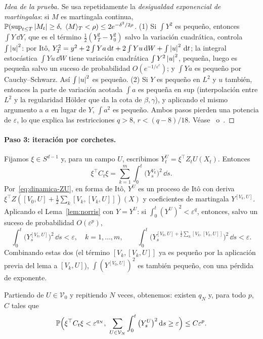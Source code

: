 \begin{proof}[Idea de la prueba]
Se usa repetidamente la \emph{desigualdad exponencial de martingalas}: si $M$ es
martingala continua, $\mathbb{P}(\sup_{t\le T}\left\lvert M_t\right\rvert\ge\delta,\ \langle M\rangle_T<\rho)\le2e^{-\delta^2/2\rho}$. (1) Si $\int Y^2$ es pequeño,
entonces $\int Y\,\dd Y$, que es el término $\frac12(Y_T^2-Y_0^2)$ salvo la variación cuadrática, controla $\int\left\lvert u\right\rvert^2$: por
Itô, $Y_T^2=y^2+2\int Ya\,\mathrm{d} t+2\int Yu\,\mathrm{d} W+\int\left\lvert u\right\rvert^2\,\mathrm{d} t$; la integral estocástica $\int Yu\,\dd W$ tiene variación
cuadrática $\int Y^2\left\lvert u\right\rvert^2$, pequeña, luego es pequeña salvo un suceso de probabilidad $O(e^{-1/\varepsilon^c})$; y
$\int Ya$ es pequeño por Cauchy--Schwarz. Así $\int\left\lvert u\right\rvert^2$ es pequeño. (2) Si $Y$ es pequeño en $L^2$ y $u$
también, entonces la parte de variación acotada $\int a$ es pequeña en sup (interpolación entre $L^2$ y
la regularidad Hölder que da la cota de $\beta,\gamma$), y aplicando el mismo argumento a $a$ en lugar de
$Y$, $\int a^2$ es pequeño. Ambos pasos pierden una potencia de $\varepsilon$, lo que explica las restricciones
$q>8$, $r<(q-8)/18$. Véase~\cite{Norris86} o~\cite[Lemma~2.3.2]{Nualart06}.
\end{proof}

\paragraph{Paso 3: iteración por corchetes.} Fijamos $\xi\in S^{d-1}$ y, para un campo $U$, escribimos
$Y^U_t=\xi^\top Z_tU(X_t)$. Entonces
\[
  \xi^\top C_t\xi=\sum_{k=1}^m\int_0^t\big(Y^{V_k}_s\big)^2\,\dd s.
\]
Por~\eqref{eq:dinamica-ZU}, en forma de Itô, $Y^U$ es un proceso de Itô con deriva $\xi^\top Z([V_0,U]+
\frac12\sum_k[V_k,[V_k,U]])(X)$ y coeficientes de martingala $Y^{[V_k,U]}$. Aplicando el Lema~\ref{lem:norris} con
$Y=Y^U$: si $\int_0^t(Y^U)^2<\varepsilon^q$, entonces, salvo un suceso de probabilidad $O(\varepsilon^p)$,
\[
  \int_0^t\big(Y^{[V_k,U]}_s\big)^2\,\dd s<\varepsilon,\quad k=1,\dots,m,\qquad\int_0^t\Big(Y_s^{[V_0,U]+\frac12\sum_k[V_k,[V_k,U]]}\Big)^2\,\dd s<\varepsilon.
\]
Combinando estas dos (el término $[V_k,[V_k,U]]$ ya es pequeño por la aplicación previa del lema
a $[V_k,U]$), $\int(Y^{[V_0,U]})^2$ es también pequeño, con una pérdida de exponente.

Partiendo de $U\in\mathcal V_0$ y repitiendo $N$ veces, obtenemos: existen $q_N$ y, para todo $p$, $C$ tales
que
\[
  \mathbb{P}\Big(\xi^\top C_t\xi<\varepsilon^{q_N},\ \sum_{U\in\mathcal V_N}\int_0^t\big(Y^U_s\big)^2\,\mathrm{d} s\ge\varepsilon\Big)\le C\varepsilon^p.
\]

